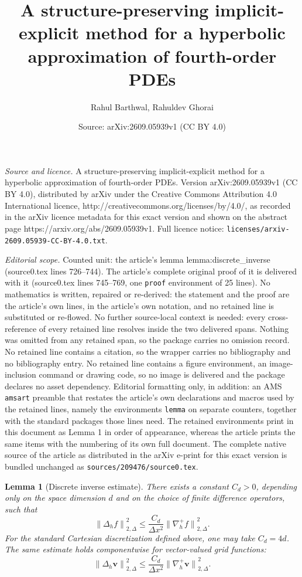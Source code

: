 \documentclass[10pt,a4paper]{amsart}
\title{A structure-preserving implicit-explicit method for a hyperbolic approximation of fourth-order PDEs}
\author{Rahul Barthwal, Rahuldev Ghorai}
\date{Source: arXiv:2609.05939v1 (CC BY 4.0)}
\newtheorem{lemma}{Lemma}
\begin{document}
\maketitle

\noindent\emph{Source and licence.} A structure-preserving implicit-explicit method for a hyperbolic approximation of fourth-order PDEs. Version arXiv:2609.05939v1 (CC BY 4.0), distributed by arXiv under the Creative Commons Attribution 4.0 International licence, http://creativecommons.org/licenses/by/4.0/, as recorded in the arXiv licence metadata for this exact version and shown on the abstract page https://arxiv.org/abs/2609.05939v1. Full licence notice: \texttt{licenses/arxiv-2609.05939-CC-BY-4.0.txt}.\par\smallskip

\noindent\textit{Editorial scope.} Counted unit: the article's lemma lemma:discrete\_inverse (source0.tex lines 726--744). The article's complete original proof of it is delivered with it (source0.tex lines 745--769, one \texttt{proof} environment of 25 lines). No mathematics is written, repaired or re-derived: the statement and the proof are the article's own lines, in the article's own notation, and no retained line is substituted or re-flowed.  No further source-local context is needed: every cross-reference of every retained line resolves inside the two delivered spans.  Nothing was omitted from any retained span, so the package carries no omission record.  No retained line contains a citation, so the wrapper carries no bibliography and no bibliography entry.  No retained line contains a figure environment, an image-inclusion command or drawing code, so no image is delivered and the package declares no asset dependency.  Editorial formatting only, in addition: an AMS \texttt{amsart} preamble that restates the article's own declarations and macros used by the retained lines, namely the environments \texttt{lemma} on separate counters, together with the standard packages those lines need.  The retained environments print in this document as Lemma 1 in order of appearance, whereas the article prints the same items with the numbering of its own full document.  The complete native source of the article as distributed in the arXiv e-print for this exact version is bundled unchanged as \texttt{sources/209476/source0.tex}.
\begin{lemma}[Discrete inverse estimate]
\label{lemma:discrete_inverse}
There exists a constant $C_d>0$, depending only on the space dimension $d$ and on the choice of finite difference operators, such that
\begin{equation}
    \label{eq:scalar_lap-grad}
    {\|\Delta_h f\|}_{2, \Delta}^2
\leq
\frac{C_d}{\Delta x^2}
{\|\nabla_h^+ f\|}_{2, \Delta}^2.
\end{equation}
For the standard Cartesian discretization defined above, one may take $C_d=4d$. The same estimate holds componentwise for vector-valued grid functions:
\begin{equation}
    \label{eq:vector_lap-grad}
    {\|\Delta_h\mathbf v\|}_{2, \Delta}^2
\leq
\frac{C_d}{\Delta x^2}
{\|\nabla_h^+\mathbf v\|}_{2, \Delta}^2.
\end{equation}
\end{lemma}
\end{document}
